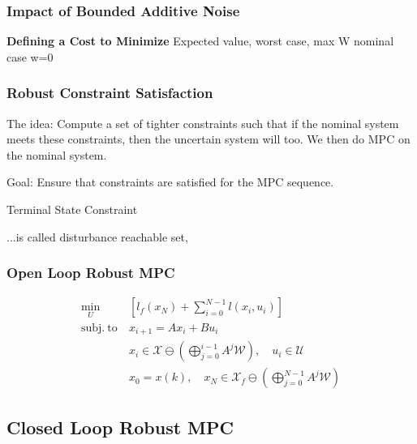 

\subsubsection{Impact of Bounded Additive Noise}

\textbf{Defining a Cost to Minimize}
Expected value,
worst case, max W
nominal case w=0

\subsubsection{Robust Constraint Satisfaction}

The idea: Compute a set of tighter constraints such that if the nominal
system meets these constraints, then the uncertain system will too.
We then do MPC on the nominal system.

Goal: Ensure that constraints are satisfied for the MPC sequence.

Terminal State Constraint

...is called disturbance reachable set,

\subsubsection{Open Loop Robust MPC}
\begin{align*}
	\min_U                & \left[ l_f(x_N) + \textstyle\sum_{i=0}^{N-1} l(x_i, u_i) \right]                                    \\
	\mathrm{subj.\ to }\  & x_{i+1} = A x_i + B u_i                                                                             \\
	                      & x_i \in \mathcal{X} \ominus ( \textstyle\bigoplus_{j=0}^{i-1} A^j \mathcal{W} ), \quad
	u_i \in \mathcal{U}                                                                                                         \\
	                      & x_0 = x(k), \quad x_N \in \mathcal{X}_f \ominus ( \textstyle\bigoplus_{j=0}^{N-1} A^j \mathcal{W} )
\end{align*}

\subsection{Closed Loop Robust MPC}


